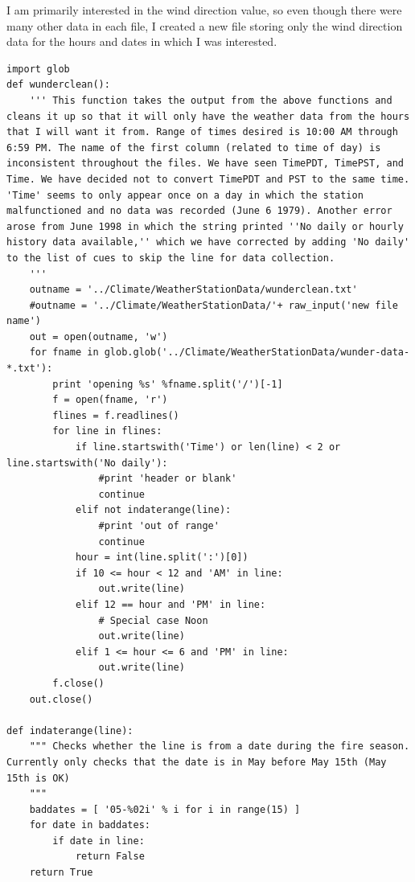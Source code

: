 I am primarily interested in the wind direction value, so even though there were many other data in each file, I created a new file storing only the wind direction data for the hours and dates in which I was interested.
\begin{lstlisting}
import glob
def wunderclean():
    ''' This function takes the output from the above functions and cleans it up so that it will only have the weather data from the hours that I will want it from. Range of times desired is 10:00 AM through 6:59 PM. The name of the first column (related to time of day) is inconsistent throughout the files. We have seen TimePDT, TimePST, and Time. We have decided not to convert TimePDT and PST to the same time. 'Time' seems to only appear once on a day in which the station malfunctioned and no data was recorded (June 6 1979). Another error arose from June 1998 in which the string printed ''No daily or hourly history data available,'' which we have corrected by adding 'No daily' to the list of cues to skip the line for data collection.
    '''
    outname = '../Climate/WeatherStationData/wunderclean.txt'
    #outname = '../Climate/WeatherStationData/'+ raw_input('new file name')
    out = open(outname, 'w')
    for fname in glob.glob('../Climate/WeatherStationData/wunder-data-*.txt'):
        print 'opening %s' %fname.split('/')[-1]
        f = open(fname, 'r')
        flines = f.readlines()
        for line in flines:
            if line.startswith('Time') or len(line) < 2 or line.startswith('No daily'):
                #print 'header or blank'
                continue
            elif not indaterange(line):
                #print 'out of range'
                continue
            hour = int(line.split(':')[0])
            if 10 <= hour < 12 and 'AM' in line:
                out.write(line)
            elif 12 == hour and 'PM' in line:
                # Special case Noon
                out.write(line)
            elif 1 <= hour <= 6 and 'PM' in line:
                out.write(line)
        f.close()
    out.close() 

def indaterange(line):
    """ Checks whether the line is from a date during the fire season. Currently only checks that the date is in May before May 15th (May 15th is OK)
    """
    baddates = [ '05-%02i' % i for i in range(15) ]
    for date in baddates:
        if date in line:
            return False
    return True


\end{lstlisting}

